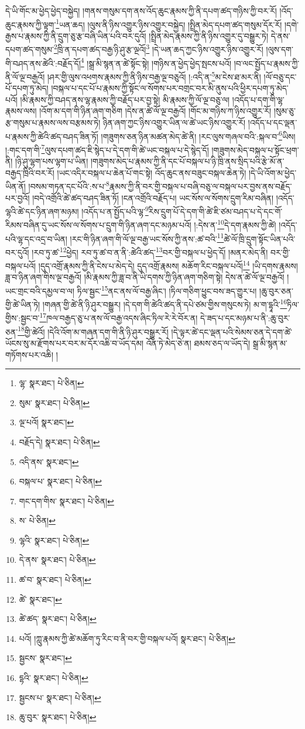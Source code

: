 དེ་ཡི་གོང་མ་ཕྱེད་ཕྱེད་བསྐྱེད། །གནས་གསུམ་དག་ནས་འོད་ཆུང་རྣམས་ཀྱི་ནི་དཔག་ཚད་གཉིས་ཀྱི་བར་རོ། །འོད་ཆུང་རྣམས་ཀྱི་ལྟག་\footnote{ལྷ་  སྣར་ཐང་།  པེ་ཅིན། }ཡན་ཆད། །ལུས་ནི་ཉིས་འགྱུར་ཉིས་འགྱུར་བསྐྱེད། །སྤྲིན་མེད་དཔག་ཚད་གསུམ་དོར་རོ། །དགེ་རྒྱས་པ་རྣམས་ཀྱི་ནི་དྲུག་ཅུ་རྩ་བཞི་ཡིན་པའི་བར་དུའོ། །སྤྲིན་མེད་རྣམས་ཀྱི་ནི་ཉིས་འགྱུར་དུ་བསྒྱུར་ཏེ། དེ་ནས་དཔག་ཚད་གསུམ་\footnote{སུམ་  སྣར་ཐང་།  པེ་ཅིན། }ཁྲི་ན་དཔག་ཚད་བརྒྱ་ཉི་ཤུ་རྩ་ལྔའོ།\footnote{ལྔ་པའོ།  སྣར་ཐང་། } །དེ་ཡན་ཆད་ཀྱང་ཉིས་འགྱུར་ཉིས་འགྱུར་རོ། །ལུས་དག་གི་བཤད་ནས་ཚེའི་:བརྗོད་དོ།\footnote{བརྗོད་དེ།  སྣར་ཐང་།  པེ་ཅིན། } །སྒྲ་མི་སྙན་ན་ཚེ་སྟོང་སྟེ། །གཉིས་ན་ཕྱེད་ཕྱེད་སྤངས་པའོ། །བ་ལང་སྤྱོད་པ་རྣམས་ཀྱི་ནི་ལོ་ལྔ་བརྒྱའོ། །ཤར་གྱི་ལུས་འཕགས་རྣམས་ཀྱི་ནི་ཉིས་བརྒྱ་ལྔ་བཅུའོ། །:འདི་ན་\footnote{འདི་ནས་  སྣར་ཐང་། }མ་ངེས་ཐ་མར་ནི། །ལོ་བཅུ་དང་པོ་དཔག་ཏུ་མེད། །བསྐལ་པ་དང་པོ་པ་རྣམས་ཀྱི་སྟོང་ལ་སོགས་པར་བགྲང་བར་མི་ནུས་པའི་ཕྱིར་དཔག་ཏུ་མེད་པའོ། །མི་རྣམས་ཀྱི་བཤད་ནས་ལྷ་རྣམས་ཀྱི་བརྗོད་པར་བྱ་སྟེ། མི་རྣམས་ཀྱི་ལོ་ལྔ་བཅུ་ལ། །འདོད་པ་དག་གི་ལྷ་རྣམས་ལས། །འོག་མ་དག་གི་ཉིན་ཞག་གཅིག །དེས་ན་ཚེ་ལོ་ལྔ་བརྒྱའོ། །གོང་མ་གཉིས་ཀ་ཉིས་འགྱུར་རོ། །སུམ་ཅུ་རྩ་གསུམ་པ་རྣམས་ལས་བརྩམས་ཏེ། ཉིན་ཞག་ཀྱང་ཉིས་འགྱུར་ཡིན་ལ་ཚེ་ཡང་ཉིས་འགྱུར་རོ། །འདོད་པ་དང་ལྡན་པ་རྣམས་ཀྱི་ཚེའི་ཚད་བཤད་ཟིན་ཏོ། །གཟུགས་ཅན་ཉིན་མཚན་མེད་ཚེ་ནི། །རང་ལུས་གཞལ་བའི་:སྐལ་བ་\footnote{བསྐལ་པ་  སྣར་ཐང་།  པེ་ཅིན། }ཡིས། །:གང་དག་གི་\footnote{གང་དག་གིས་  སྣར་ཐང་།  པེ་ཅིན། }ལུས་དཔག་ཚད་ཇི་སྙེད་པ་དེ་དག་གི་ཚེ་ཡང་བསྐལ་པ་དེ་སྙེད་དོ། །གཟུགས་མེད་བསྐལ་པ་སྟོང་ཕྲག་ནི། །ཉི་ཤུ་ལྷག་པས་ལྷག་པ་ཡིན། །གཟུགས་མེད་པ་རྣམས་ཀྱི་ནི་དང་པོ་བསྐལ་པ་ཉི་ཁྲི་ནས་སྲིད་པའི་རྩེ་མོ་ན་བརྒྱད་ཁྲིའི་བར་རོ། །ཡང་འདིར་བསྐལ་པ་ཆེན་པོ་གང་སྟེ། འོད་ཆུང་ནས་བཟུང་བསྐལ་ཆེན་ཏེ། །དེ་ཡི་འོག་མ་ཕྱེད་ཡིན་ནོ། །བསམ་གཏན་དང་པོའི་:ས་པ་\footnote{ས་  པེ་ཅིན། }རྣམས་ཀྱི་ནི་བར་གྱི་བསྐལ་པ་བཞི་བཅུ་ལ་བསྐལ་པར་བྱས་ནས་བརྗོད་པར་བྱའོ། །བདེ་འགྲོའི་ཚེ་ཚད་བཤད་ཟིན་ཏོ། །ངན་འགྲོའི་བརྗོད་པ། ཡང་སོས་ལ་སོགས་དྲུག་རིམ་བཞིན། །འདོད་ལྷའི་ཚེ་དང་ཉིན་ཞག་མཉམ། །འདོད་པ་ན་སྤྱོད་པའི་ལྷ་\footnote{ལྷའི་  སྣར་ཐང་།  པེ་ཅིན། }རིས་དྲུག་པོ་དེ་དག་གི་ཚེ་ཇི་ཙམ་བཤད་པ་དེ་དང་གོ་རིམས་བཞིན་དུ་ཡང་སོས་ལ་སོགས་པ་དྲུག་གི་ཉིན་ཞག་དང་མཉམ་པའོ། །:དེས་ན་\footnote{དེ་ནས་  སྣར་ཐང་།  པེ་ཅིན། }དེ་དག་རྣམས་ཀྱི་ཚེ། །འདོད་པའི་ལྷ་དང་འདྲ་བ་ཡིན། །རང་གི་ཉིན་ཞག་གི་ལོ་ལྔ་བརྒྱ་ཡང་སོས་ཀྱི་ནས་:ཚ་བའི་\footnote{ཚ་བ་  སྣར་ཐང་།  པེ་ཅིན། }ཚེ་ལོ་ཁྲི་དྲུག་སྟོང་ཡིན་པའི་བར་དུའོ། །རབ་ཏུ་ཚ་\footnote{ཚེ་  སྣར་ཐང་། }ཕྱེད། རབ་ཏུ་ཚ་བ་ན་ནི་:ཚེའི་ཚད་\footnote{ཚེ་ཚད་  སྣར་ཐང་།  པེ་ཅིན། }བར་གྱི་བསྐལ་པ་ཕྱེད་དོ། །མནར་མེད་ནི། བར་གྱི་བསྐལ་པའོ། །དུད་འགྲོ་རྣམས་ཀྱི་ནི་ངེས་པ་མེད་དེ། དུད་འགྲོ་རྣམས། མཆོག་རིང་བསྐལ་པའོ།\footnote{པའོ། །ཀླུ་རྣམས་ཀྱི་ཚེ་མཆོག་ཏུ་རིང་བ་ནི་བར་གྱི་བསྐལ་པའོ།  སྣར་ཐང་།  པེ་ཅིན། } །ཡི་དགས་རྣམས། ཟླ་བ་ཉིན་ཞག་གིས་ལྔ་བརྒྱའོ། །མི་རྣམས་ཀྱི་ཟླ་བ་ནི་ཡི་དགས་ཀྱི་ཉིན་ཞག་གཅིག་སྟེ། དེས་ན་ཚེ་ལོ་ལྔ་བརྒྱའོ། །ཡང་གྲང་བའི་དམྱལ་བ་ལ། ཏིལ་སྦྱང་\footnote{སྦྱངས་  སྣར་ཐང་། }ནང་ནས་ལོ་བརྒྱ་ཞིང་། །ཏིལ་གཅིག་ཕྱུང་བས་ཟད་གྱུར་པ། །ཆུ་བུར་ཅན་གྱི་ཚེ་ཡིན་ཏེ། །གཞན་གྱི་ཚེ་ནི་ཉི་ཤུར་བསྒྱུར། །དེ་དག་གི་ཚེའི་ཚད་ནི་དཔེ་ཙམ་གྱིས་གསུངས་ཏེ། མ་ག་དྷཱའི་\footnote{དྷའི་  སྣར་ཐང་།  པེ་ཅིན། }ཏིལ་གྱིས་:སྦྱང་བ་\footnote{སྦྱངས་པ་  སྣར་ཐང་།  པེ་ཅིན། }ཁལ་བརྒྱད་ཅུ་པ་ནས་ལོ་བརྒྱ་འདས་ཞིང་ཏིལ་རེ་རེ་བོར་ན། དེ་ཟད་པ་དང་མཉམ་པ་ནི་:ཆུ་བུར་ཅན་\footnote{ཆུ་བུར་  སྣར་ཐང་།  པེ་ཅིན། }གྱི་ཚེའོ། །དེའི་འོག་མ་གཞན་དག་གི་ནི་ཉི་ཤུར་བསྒྱུར་རོ། །དེ་ལྟར་ཚེ་དང་ལྡན་པའི་སེམས་ཅན་དེ་དག་ཚེ་ཡོངས་སུ་མ་རྫོགས་པར་བར་མ་དོར་འཆི་བ་ཡོད་དམ། འོན་ཏེ་མེད་ཅེ་ན། ཐམས་ཅད་ལ་ཡོད་དེ། སྒྲ་མི་སྙན་མ་གཏོགས་པར་འཆི། །
